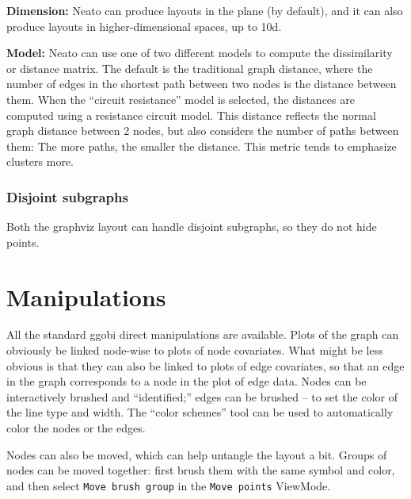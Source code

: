 \documentclass[11pt]{article}
\begin{document}
{\bf Dimension:}  Neato can produce layouts in the plane (by default),
and it can also produce layouts in higher-dimensional spaces, up to 10d.

{\bf Model:}  Neato can use one of two different models to compute the
dissimilarity or distance matrix.  The default is the traditional graph
distance, where the number of edges in the shortest path between two
nodes is the distance between them.  When the ``circuit resistance''
model  is selected, the distances are computed using a resistance circuit
model. This distance reflects the normal graph distance between 2 nodes,
but also considers the number of paths between them: The more paths,
the smaller the distance.  This metric tends to emphasize clusters more.

\subsubsection{Disjoint subgraphs}

Both the graphviz layout can handle disjoint subgraphs, so they
do not hide points.

\section{Manipulations}

All the standard ggobi direct manipulations are available.  Plots of
the graph can obviously be linked node-wise to plots of node covariates.
What might be less obvious is that they can also be linked to plots of
edge covariates, so that an edge in the graph corresponds to a node in the
plot of edge data.  Nodes can be interactively brushed and ``identified;''
edges can be brushed -- to set the color of the line type and width.
The ``color schemes'' tool can be used to automatically color the nodes
or the edges.

Nodes can also be moved, which can help untangle the layout a bit.
Groups of nodes can be moved together: first brush them with
the same symbol and color, and then select {\tt Move brush group}
in the {\tt Move points} ViewMode.

\end{document}
